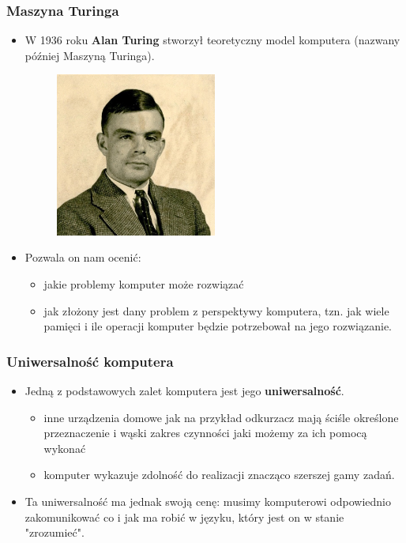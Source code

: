\documentclass{beamer}
\begin{document}
\begin{frame}[fragile]
\frametitle{Maszyna Turinga}
 \begin{itemize}
\item W 1936 roku \textbf{Alan Turing} stworzył teoretyczny model komputera (nazwany później Maszyną Turinga).

                    \begin{figure}[h]
                        \centering
                        \includegraphics[width=0.5\textwidth]{../../img/Alan_Turing_1912-1954_in_1936_at_Princeton_University.jpg}
                    \end{figure}                    
                    \item Pozwala on nam ocenić: 
	\begin{itemize}
	\item jakie problemy komputer może rozwiązać
	\item jak złożony jest dany problem z perspektywy komputera, tzn. jak wiele pamięci i ile operacji komputer będzie potrzebował na jego rozwiązanie.
	\end{itemize}
\end{itemize}
\end{frame}

\begin{frame}[fragile]
\frametitle{Uniwersalność komputera}
\begin{itemize}
\item Jedną z podstawowych zalet komputera jest jego \textbf{uniwersalność}.
	\begin{itemize}
	\item inne urządzenia domowe jak na przykład odkurzacz mają ściśle określone przeznaczenie i wąski zakres czynności jaki możemy za ich pomocą wykonać
	\item komputer wykazuje zdolność do realizacji znacząco szerszej gamy zadań.
	\end{itemize}
\item Ta uniwersalność ma jednak swoją cenę: musimy komputerowi odpowiednio zakomunikować co i jak ma robić w języku, który jest on w stanie "zrozumieć". 
\end{itemize}

\end{frame}
\end{document}

